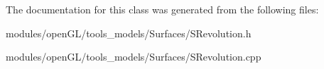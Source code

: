 The documentation for this class was generated from the following files\-:\begin{DoxyCompactItemize}
\item 
modules/open\-G\-L/tools\-\_\-models/\-Surfaces/S\-Revolution.\-h\item 
modules/open\-G\-L/tools\-\_\-models/\-Surfaces/S\-Revolution.\-cpp\end{DoxyCompactItemize}

